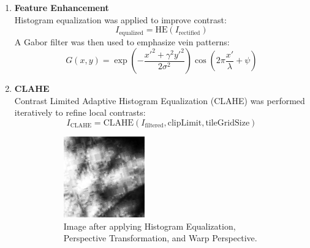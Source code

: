 \begin{enumerate}
    \item \textbf{Feature Enhancement} \\
    Histogram equalization was applied to improve contrast:
    \[
    I_{\text{equalized}} = \text{HE}(I_{\text{rectified}})
    \]
    A Gabor filter was then used to emphasize vein patterns:
    \[
    G(x, y) = \exp\left(-\frac{x'^2 + \gamma^2 y'^2}{2\sigma^2}\right) \cos\left(2\pi\frac{x'}{\lambda} + \psi\right)
    \]

    \item \textbf{CLAHE} \\
    Contrast Limited Adaptive Histogram Equalization (CLAHE) was performed iteratively to refine local contrasts:
    \[
    I_{\text{CLAHE}} = \text{CLAHE}(I_{\text{filtered}}, \text{clipLimit}, \text{tileGridSize})
    \]

    \begin{figure}[!ht]
        \centering
        \begin{subfigure}[t]{0.48\columnwidth}
            \includegraphics[width=\textwidth]{./images/preprocessing/rectified_image_equalized.png}
            \caption{Image after applying Histogram Equalization, Perspective Transformation, and Warp Perspective.}
            \label{fig:rectified_image_equalized}
        \end{subfigure}
        \hfill
        \begin{subfigure}[t]{0.48\columnwidth}

\end{subfigure}
\end{figure}
\end{enumerate}
